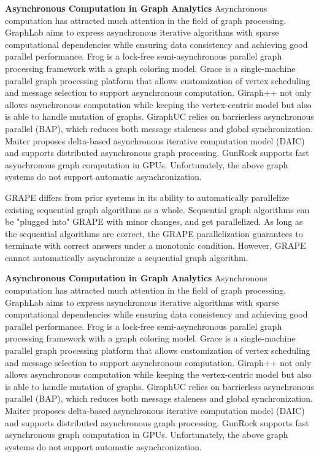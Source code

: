 \documentclass{vldb}
\begin{document}
\noindent\textbf{Asynchronous Computation in Graph Analytics} Asynchronous computation has attracted much attention in the field of graph processing. GraphLab \cite{Low:2012:DGF:2212351.2212354} aims to express asynchronous iterative algorithms with sparse computational dependencies while ensuring data consistency and achieving good parallel performance. Frog \cite{8017445} is a lock-free semi-asynchronous parallel graph processing framework with a graph coloring model. Grace \cite{grace} is a single-machine parallel graph processing platform that allows customization of vertex scheduling and message selection to support asynchronous computation. Giraph++ \cite{Tian:2013:TLV:2732232.2732238} not only allows asynchronous computation while keeping the vertex-centric model but also is able to handle mutation of graphs. GiraphUC \cite{Han:2015:GUB:2777598.2777604} relies on barrierless asynchronous parallel (BAP), which reduces both message staleness and global synchronization. Maiter \cite{maiter} proposes delta-based asynchronous iterative computation model (DAIC) and supports distributed asynchronous graph processing. GunRock \cite{Wang:2016:GHG:2851141.2851145} supports fast asynchronous graph computation in GPUs. Unfortunately, the above graph systems do not support automatic asynchronization.

GRAPE \cite{Fan:2017:PSG:3035918.3035942} differs from prior systems in its ability to automatically parallelize existing sequential graph algorithms as a whole. Sequential graph algorithms can be "plugged into" GRAPE with minor changes, and get parallelized. As long as the sequential algorithms are correct, the GRAPE parallelization guarantees to terminate with correct answers under a monotonic condition. However, GRAPE cannot automatically asynchronize a sequential graph algorithm.

\noindent\textbf{Asynchronous Computation in Graph Analytics} Asynchronous computation has attracted much attention in the field of graph processing. GraphLab \cite{Low:2012:DGF:2212351.2212354} aims to express asynchronous iterative algorithms with sparse computational dependencies while ensuring data consistency and achieving good parallel performance. Frog \cite{8017445} is a lock-free semi-asynchronous parallel graph processing framework with a graph coloring model. Grace \cite{grace} is a single-machine parallel graph processing platform that allows customization of vertex scheduling and message selection to support asynchronous computation. Giraph++ \cite{Tian:2013:TLV:2732232.2732238} not only allows asynchronous computation while keeping the vertex-centric model but also is able to handle mutation of graphs. GiraphUC \cite{Han:2015:GUB:2777598.2777604} relies on barrierless asynchronous parallel (BAP), which reduces both message staleness and global synchronization. Maiter \cite{maiter} proposes delta-based asynchronous iterative computation model (DAIC) and supports distributed asynchronous graph processing. GunRock \cite{Wang:2016:GHG:2851141.2851145} supports fast asynchronous graph computation in GPUs. Unfortunately, the above graph systems do not support automatic asynchronization.
\end{document}
